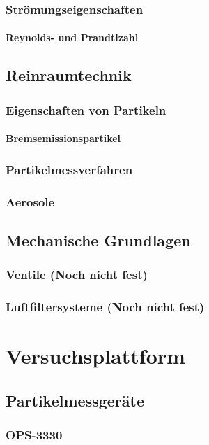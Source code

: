 \subsection{Str\"{o}mungseigenschaften}
\subsubsection{Reynolds- und Prandtlzahl}

\section{Reinraumtechnik}
\subsection{Eigenschaften von Partikeln}
\subsubsection{Bremsemissionspartikel}
\subsection{Partikelmessverfahren}
\subsection{Aerosole}

\section{Mechanische Grundlagen}
\subsection{Ventile (Noch nicht fest)}
\subsection{Luftfiltersysteme (Noch nicht fest)}


\chapter{Versuchsplattform}\label{ch:platform}
\section{Partikelmessger\"{a}te}
\subsection{OPS-3330}
